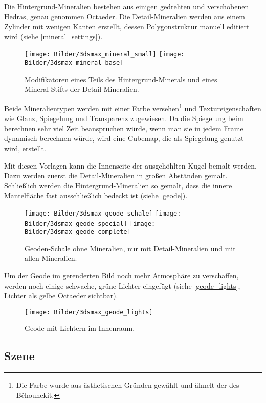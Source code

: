 \documentclass{scrreprt}
\begin{document}
Die Hintergrund-Mineralien bestehen aus einigen gedrehten und verschobenen Hedras, genau genommen Octaeder. Die Detail-Mineralien werden aus einem Zylinder mit wenigen Kanten erstellt, dessen Polygonstruktur manuell editiert wird (siehe \autoref{mineral_settings}).

\begin{figure}[!ht]
\centering
\texttt{[image: Bilder/3dsmax\_mineral\_small]}
\texttt{[image: Bilder/3dsmax\_mineral\_base]}
\caption{Modifikatoren eines Teils des Hintergrund-Minerals und eines Mineral-Stifts der Detail-Mineralien.}
\label{mineral_settings}
\end{figure}

Beide Mineralientypen werden mit einer Farbe versehen\footnote{Die Farbe wurde aus ästhetischen Gründen gewählt und ähnelt der des Běhounekit.} und Textureigenschaften wie Glanz, Spiegelung und Transparenz zugewiesen. Da die Spiegelung beim berechnen sehr viel Zeit beanspruchen würde, wenn man sie in jedem Frame dynamisch berechnen würde, wird eine Cubemap, die als Spiegelung genutzt wird, erstellt.

Mit diesen Vorlagen kann die Innenseite der ausgehöhlten Kugel bemalt werden. Dazu werden zuerst die Detail-Mineralien in großen Abständen gemalt. Schließlich werden die Hintergrund-Mineralien so gemalt, dass die innere Mantelfläche fast ausschließlich bedeckt ist (siehe \autoref{geode}).

\begin{figure}[!ht]
\centering
\texttt{[image: Bilder/3dsmax\_geode\_schale]}
\texttt{[image: Bilder/3dsmax\_geode\_special]}
\texttt{[image: Bilder/3dsmax\_geode\_complete]}
\caption{Geoden-Schale ohne Mineralien, nur mit Detail-Mineralien und mit allen Mineralien.}
\label{geode}
\end{figure}

Um der Geode im gerenderten Bild noch mehr Atmosphäre zu verschaffen, werden noch einige schwache, grüne Lichter eingefügt (siehe \autoref{geode_lights}, Lichter als gelbe Octaeder sichtbar).

\begin{figure}[!ht]
\centering
\texttt{[image: Bilder/3dsmax\_geode\_lights]}
\caption{Geode mit Lichtern im Innenraum.}
\label{geode_lights}
\end{figure}

\subsection{Szene}
\end{document}
